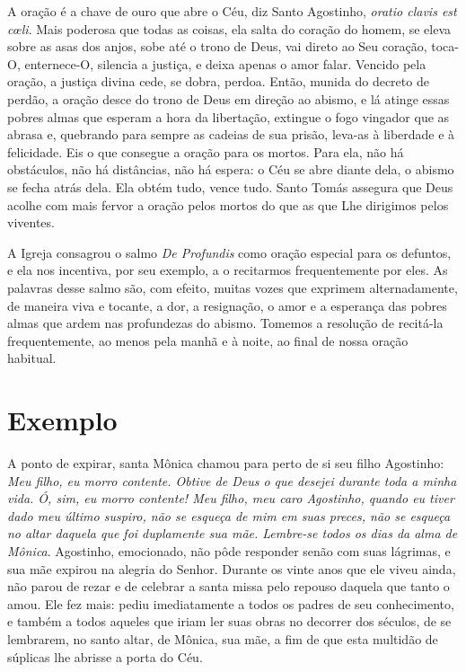 A oração é a chave de ouro que abre o Céu, diz Santo Agostinho, \textit{oratio clavis est cœli}. Mais poderosa que todas as coisas, ela salta do coração do homem, se eleva sobre as asas dos anjos, sobe até o trono de Deus, vai direto ao Seu coração, toca-O, enternece-O, silencia a justiça, e deixa apenas o amor falar. Vencido pela oração, a justiça divina cede, se dobra, perdoa. Então, munida do decreto de perdão, a oração desce do trono de Deus em direção ao abismo, e lá atinge essas pobres almas que esperam a hora da libertação, extingue o fogo vingador que as abrasa e, quebrando para sempre as cadeias de sua prisão, leva-as à liberdade e à felicidade. Eis o que consegue a oração para os mortos. Para ela, não há obstáculos, não há distâncias, não há espera: o Céu se abre diante dela, o abismo se fecha atrás dela. Ela obtém tudo, vence tudo. Santo Tomás assegura que Deus acolhe com mais fervor a oração pelos mortos do que as que Lhe dirigimos pelos viventes. 

A Igreja consagrou o salmo \textit{De Profundis} como oração especial para os defuntos, e ela nos incentiva, por seu exemplo, a o recitarmos frequentemente por eles. As palavras desse salmo são, com efeito, muitas  vozes que exprimem alternadamente, de maneira viva e tocante, a dor, a resignação, o amor e a esperança das pobres almas que ardem nas profundezas do abismo. Tomemos a resolução de recitá-la frequentemente, ao menos pela manhã e à noite, ao final de nossa oração habitual. 


\section*{Exemplo}

A ponto de expirar, santa Mônica chamou para perto de si seu filho Agostinho: \textit{Meu filho, eu morro contente. Obtive de Deus o que desejei durante toda a minha vida. Ó, sim, eu morro contente! Meu filho, meu caro Agostinho, quando eu tiver dado meu último suspiro, não se esqueça de mim em suas preces, não se esqueça no altar daquela que foi duplamente sua mãe. Lembre-se todos os dias da alma de Mônica}. Agostinho, emocionado, não pôde responder senão com suas lágrimas, e sua mãe expirou na alegria do Senhor. Durante os vinte anos que ele viveu ainda, não parou de rezar e de celebrar a santa missa pelo repouso daquela que tanto o amou. Ele fez mais: pediu imediatamente a todos os padres de seu conhecimento, e também a todos aqueles que iriam ler suas obras no decorrer dos séculos, de se lembrarem, no santo altar, de Mônica, sua mãe, a fim de que esta multidão de súplicas lhe abrisse a porta do Céu.

